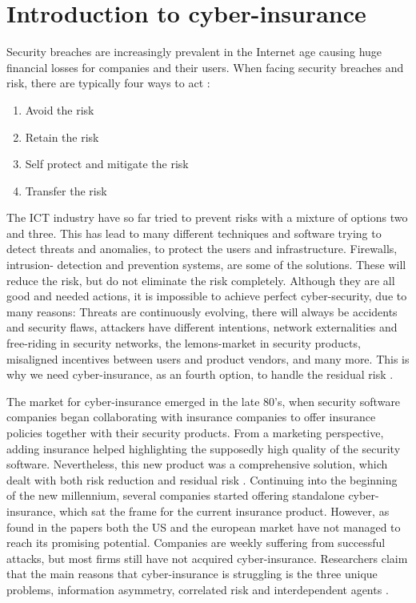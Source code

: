 \section{Introduction to cyber-insurance}
Security breaches are increasingly prevalent in the Internet age causing huge financial losses
for companies and their users. When facing security breaches and risk, there are typically four ways to act \cite{bolot:cyber}:
\begin{enumerate}
\item Avoid the risk
\item Retain the risk
\item Self protect and mitigate the risk
\item Transfer the risk
\end{enumerate}
The ICT industry have so far tried to prevent risks with a mixture of options two and three. This has lead to many different techniques and software trying to detect threats and anomalies, to protect the users and infrastructure. Firewalls, intrusion- detection and prevention systems, are some of the solutions. These will reduce the risk, but do not eliminate the risk completely. Although they are all good and needed actions, it is impossible to achieve perfect cyber-security, due to many reasons: Threats are continuously evolving, there will always be accidents and security flaws, attackers have different intentions, network externalities and free-riding in security networks, the lemons-market in security products, misaligned incentives between users and product vendors, and many more. 
This is why we need cyber-insurance, as an fourth option, to handle the residual risk \cite{bolot:cyber2,ranjan:cyber}.

The market for cyber-insurance emerged in the late 80's, when security software companies began collaborating with insurance companies to offer insurance policies together with their security products. From a marketing perspective, adding insurance helped highlighting the supposedly high quality of the security software. Nevertheless, this new product was a comprehensive solution, which dealt with both risk reduction and residual risk \cite{bolot:new}. Continuing into the beginning of the new millennium, several companies started offering standalone cyber-insurance, which sat the frame for the current insurance product. However, as found in the papers \cite{ccost,evolvingcyber,CFCunder} both the US and the european market have not managed to reach its promising potential. Companies are weekly suffering from successful attacks, but most firms still have not acquired cyber-insurance. 
Researchers claim that the main reasons that cyber-insurance is struggling is the three unique problems, information asymmetry, correlated risk and interdependent agents \cite{bohme2010modeling}. 
